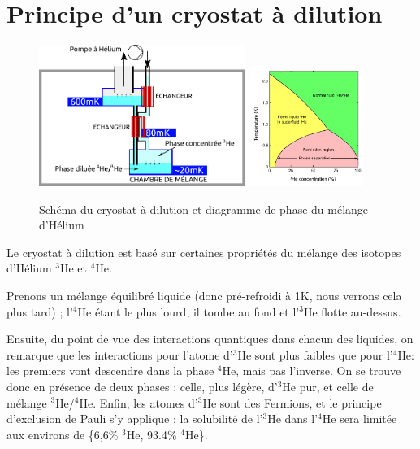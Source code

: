 \documentclass[a4paper,11pt]{report}
\newcommand{\HeT}{$^3$He\xspace}
\newcommand{\HeQ}{$^4$He\xspace}
\begin{document}
\section{Principe d'un cryostat à dilution}
\begin{figure}[h]
  \begin{center}
    \includegraphics[width=0.6\textwidth]{Images/Cryostat_Schema.pdf}
    \qquad
    \includegraphics[width=0.33\textwidth]{Images/Helium_phase_diagram.pdf}
    \caption{Schéma du cryostat à dilution et diagramme de phase du mélange d'Hélium}
  \end{center}
\end{figure}
Le cryostat à dilution est basé sur certaines propriétés du mélange des isotopes d'Hélium \HeT et \HeQ.
\newline

Prenons un mélange équilibré liquide (donc pré-refroidi à 1K, nous verrons cela plus tard) ; l'\HeQ étant le plus lourd, il tombe au fond et l'\HeT flotte au-dessus.

Ensuite, du point de vue des interactions quantiques dans chacun des liquides, on remarque que les interactions pour l'atome d'\HeT sont plus faibles que pour l'\HeQ : les premiers vont descendre dans la phase \HeQ, mais pas l'inverse.
\newline
On se trouve donc en présence de deux phases : celle, plus légère, d'\HeT pur, et celle de mélange \HeT/\HeQ.
Enfin, les atomes d'\HeT sont des Fermions, et le principe d'exclusion de Pauli s'y applique : la solubilité de l'\HeT dans l'\HeQ sera limitée aux environs de \{6,6\% \HeT, 93.4\% \HeQ\}.
\newline
\end{document}
